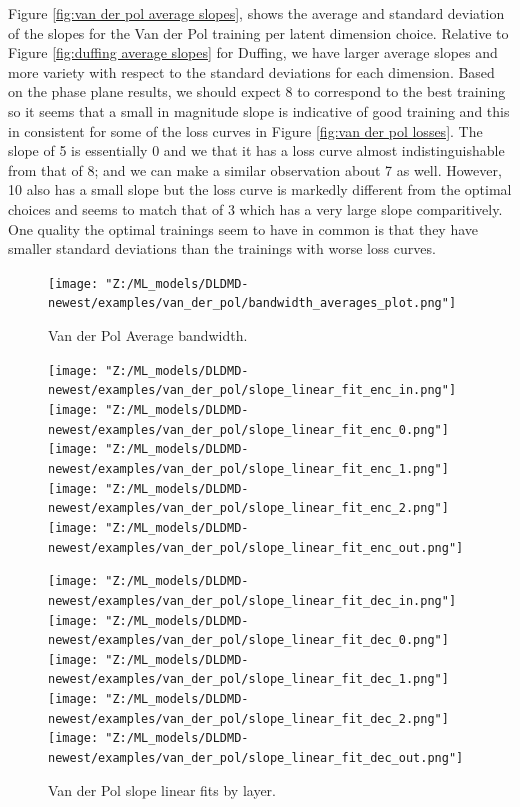 Figure \ref{fig:van der pol average slopes}, shows the average and standard deviation of the slopes for 
the Van der Pol training per latent dimension choice. Relative to Figure \ref{fig:duffing average slopes}
for Duffing, we have larger average slopes and more variety with respect to the standard deviations for 
each dimension. Based on the phase plane results, we should expect 8 to correspond to the best training 
so it seems that a small in magnitude slope is indicative of good training and this in consistent for
some of the loss curves in Figure \ref{fig:van der pol losses}. The slope of 5 is essentially 0 and 
we that it has a loss curve almost indistinguishable from that of 8; and we can make a similar observation
about 7 as well. However, 10 also has a small slope but the loss curve is markedly different from the 
optimal choices and seems to match that of 3 which has a very large slope comparitively. One quality
the optimal trainings seem to have in common is that they have smaller standard deviations than the 
trainings with worse loss curves. 

\begin{figure}[ht]
    \centering
    \begin{minipage}{\textwidth}
        \texttt{[image: "Z:/ML\_models/DLDMD-newest/examples/van\_der\_pol/bandwidth\_averages\_plot.png"]} 
    \end{minipage} 
    \caption{Van der Pol Average bandwidth.}
\end{figure}



\begin{figure}[h!p]
    \centering
    \begin{minipage}{.5\textwidth}
        \texttt{[image: "Z:/ML\_models/DLDMD-newest/examples/van\_der\_pol/slope\_linear\_fit\_enc\_in.png"]} 
        \texttt{[image: "Z:/ML\_models/DLDMD-newest/examples/van\_der\_pol/slope\_linear\_fit\_enc\_0.png"]} 
        \texttt{[image: "Z:/ML\_models/DLDMD-newest/examples/van\_der\_pol/slope\_linear\_fit\_enc\_1.png"]} 
        \texttt{[image: "Z:/ML\_models/DLDMD-newest/examples/van\_der\_pol/slope\_linear\_fit\_enc\_2.png"]} 
        \texttt{[image: "Z:/ML\_models/DLDMD-newest/examples/van\_der\_pol/slope\_linear\_fit\_enc\_out.png"]} 
    \end{minipage}%
    \begin{minipage}{.5\textwidth}
        \texttt{[image: "Z:/ML\_models/DLDMD-newest/examples/van\_der\_pol/slope\_linear\_fit\_dec\_in.png"]} 
        \texttt{[image: "Z:/ML\_models/DLDMD-newest/examples/van\_der\_pol/slope\_linear\_fit\_dec\_0.png"]} 
        \texttt{[image: "Z:/ML\_models/DLDMD-newest/examples/van\_der\_pol/slope\_linear\_fit\_dec\_1.png"]} 
        \texttt{[image: "Z:/ML\_models/DLDMD-newest/examples/van\_der\_pol/slope\_linear\_fit\_dec\_2.png"]} 
        \texttt{[image: "Z:/ML\_models/DLDMD-newest/examples/van\_der\_pol/slope\_linear\_fit\_dec\_out.png"]} 
    \end{minipage}
    \caption{Van der Pol slope linear fits by layer.}
    \label{fig:van der pol slopes all layers}
\end{figure}

